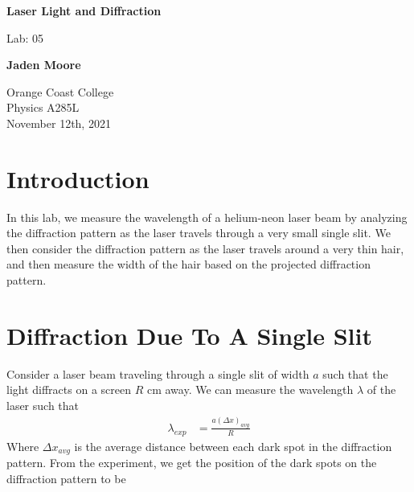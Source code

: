 \documentclass[12pt]{article}
\begin{document}

\begin{titlepage}
    \begin{center}
        \vspace*{1cm}
        \textbf{Laser Light and Diffraction}

        \vspace{0.5cm}
        Lab: 05

        \vspace{1cm}

        \textbf{Jaden Moore}

        \vfill

        Orange Coast College\\
        Physics A285L\\
        November 12th, 2021

    \end{center}
\end{titlepage}

\pagestyle{fancy}
\fancyhf{}
\setlength{\headheight}{15pt}
\cfoot{\thepage}

\section{Introduction}
In this lab, we measure the wavelength of a helium-neon laser beam by analyzing the diffraction pattern as the laser travels through a very small single slit. We then consider the diffraction pattern as the laser travels around a very thin hair, and then measure the width of the hair based on the projected diffraction pattern.

\section{Diffraction Due To A Single Slit}
Consider a laser beam traveling through a single slit of width $a$ such that the light diffracts on a screen $R$ cm away. We can measure the wavelength $\lambda$ of the laser such that
\begin{equation}
    \begin{split}
        \lambda_{exp} &= \frac{a (\Delta x)_{avg}}{R}
    \end{split}
\end{equation}
Where $\Delta x_{avg}$ is the average distance between each dark spot in the diffraction pattern. From the experiment, we get the position of the dark spots on the diffraction pattern to be
\end{document}
